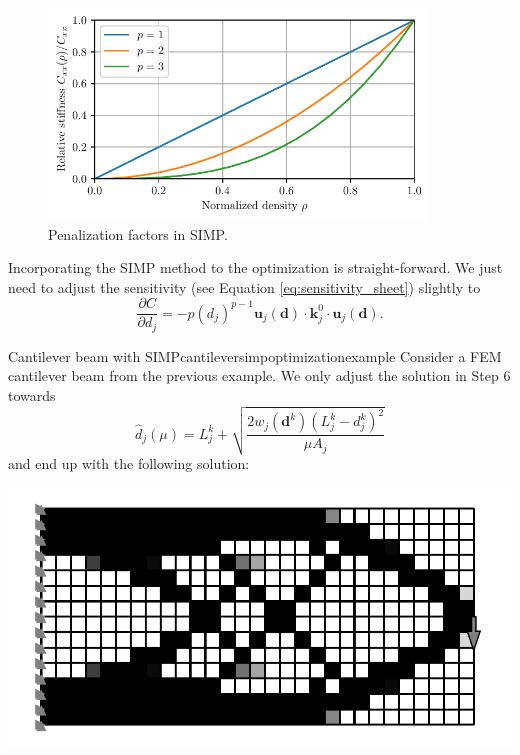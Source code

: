 \begin{figure}[!htpb]
    \centering
    \includegraphics[width=0.9\textwidth]{figures/simp.pdf}
    \caption{Penalization factors in SIMP.}
    \label{fig:simp}
\end{figure}

Incorporating the SIMP method to the optimization is straight-forward. We just need to adjust the sensitivity (see Equation \ref{eq:sensitivity_sheet}) slightly to
\begin{equation}
    \frac{\partial C}{\partial d_j} = - p (d_j)^{p-1} \mathbf{u}_j(\mathbf{d})  \cdot \mathbf{k}^0_j \cdot \mathbf{u}_j(\mathbf{d}).
\end{equation}

\begin{example}{Cantilever beam with SIMP}{cantileversimpoptimizationexample}
    Consider a FEM cantilever beam from the previous example. We only adjust the solution in Step 6 towards 
    \begin{equation}
        \hat{d}_j(\mu) = L_j^k + \sqrt{\frac{2 w_j (\mathbf{d}^k)
        (L^k_j-d^k_j)^2}{\mu A_j}}
    \end{equation}
    and end up with the following solution:

    \begin{center}
        \includegraphics[width=0.9\linewidth]{figures/cantilever_fem_optimized_binary.pdf}
    \end{center}
\end{example}

